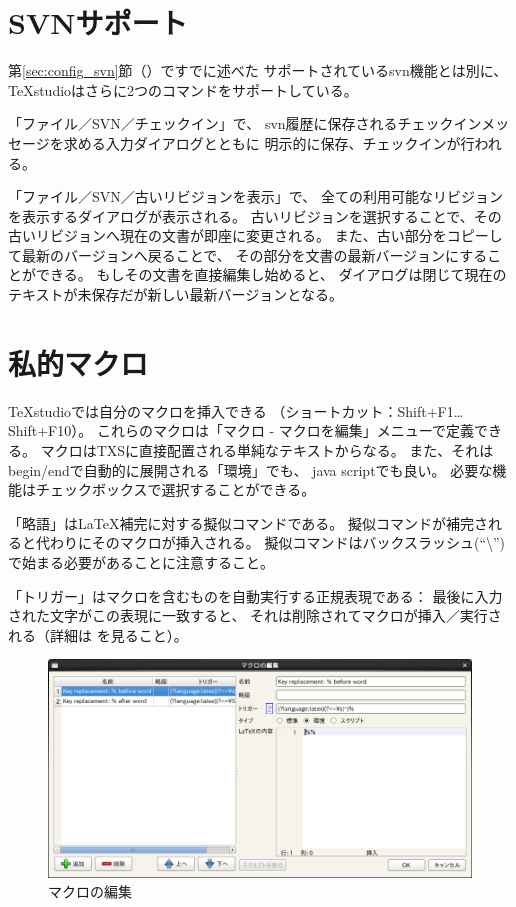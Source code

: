 \section{SVNサポート}\label{sec:svnsupport}

第\ref{sec:config_svn}節（）ですでに述べた
サポートされているsvn機能とは別に、
TeXstudioはさらに2つのコマンドをサポートしている。

「ファイル／SVN／チェックイン」で、
svn履歴に保存されるチェックインメッセージを求める入力ダイアログとともに
明示的に保存、チェックインが行われる。

「ファイル／SVN／古いリビジョンを表示」で、
全ての利用可能なリビジョンを表示するダイアログが表示される。
古いリビジョンを選択することで、その古いリビジョンへ現在の文書が即座に変更される。
また、古い部分をコピーして最新のバージョンへ戻ることで、
その部分を文書の最新バージョンにすることができる。
もしその文書を直接編集し始めると、
ダイアログは閉じて現在のテキストが未保存だが新しい最新バージョンとなる。

\section{私的マクロ}

TeXstudioでは自分のマクロを挿入できる
（ショートカット：Shift+F1\ldots{}Shift+F10）。
これらのマクロは「マクロ - マクロを編集」メニューで定義できる。
マクロはTXSに直接配置される単純なテキストからなる。
また、それはbegin/endで自動的に展開される「環境」でも、
java scriptでも良い。
必要な機能はチェックボックスで選択することができる。

「略語」はLaTeX補完に対する擬似コマンドである。
擬似コマンドが補完されると代わりにそのマクロが挿入される。
擬似コマンドはバックスラッシュ(``\textbackslash{}'')で始まる必要があることに注意すること。

「トリガー」はマクロを含むものを自動実行する正規表現である：
最後に入力された文字がこの表現に一致すると、
それは削除されてマクロが挿入／実行される（詳細は
を見ること）。

\begin{figure}[H]
  \centering
  \includegraphics[width=.8\linewidth]{doc17.png}
  \caption{マクロの編集}
\end{figure}

